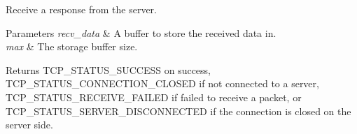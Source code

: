 Receive a response from the server. 


\begin{DoxyParams}{Parameters}
{\em recv\-\_\-data} & A buffer to store the received data in. \\
\hline
{\em max} & The storage buffer size. \\
\hline
\end{DoxyParams}
\begin{DoxyReturn}{Returns}
T\-C\-P\-\_\-\-S\-T\-A\-T\-U\-S\-\_\-\-S\-U\-C\-C\-E\-S\-S on success, T\-C\-P\-\_\-\-S\-T\-A\-T\-U\-S\-\_\-\-C\-O\-N\-N\-E\-C\-T\-I\-O\-N\-\_\-\-C\-L\-O\-S\-E\-D if not connected to a server, T\-C\-P\-\_\-\-S\-T\-A\-T\-U\-S\-\_\-\-R\-E\-C\-E\-I\-V\-E\-\_\-\-F\-A\-I\-L\-E\-D if failed to receive a packet, or T\-C\-P\-\_\-\-S\-T\-A\-T\-U\-S\-\_\-\-S\-E\-R\-V\-E\-R\-\_\-\-D\-I\-S\-C\-O\-N\-N\-E\-C\-T\-E\-D if the connection is closed on the server side. 
\end{DoxyReturn}

